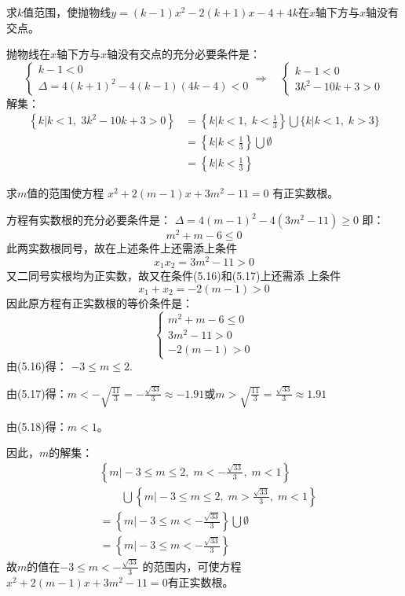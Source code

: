 \begin{example}
    求$k$值范围，使抛物线$y=(k-1)x^2-2(k+1)x-4+4k$在$x$轴下方与$x$轴没有交点。
\end{example}

\begin{solution}
    抛物线在$x$轴下方与$x$轴没有交点的充分必要条件是：
\[\begin{cases}
    k-1<0 \\ \Delta=4(k+1)^2-4(k-1)(4k-4)<0
\end{cases}\Rightarrow \quad \begin{cases}
    k-1<0 \\ 3k^2-10k+3>0
\end{cases}\]
解集：
\[\begin{split}
\left\{k|k<1,\; 3k^2-10k+3>0 \right\}&=\left\{k\Big|k<1,\; k<\frac{1}{3} \right\}\bigcup\{k|k<1,\; k>3 \}\\
&=\left\{k\Big|k<\frac{1}{3} \right\}\bigcup\emptyset\\
&=\left\{k\Big|k<\frac{1}{3} \right\}
\end{split}\]
\end{solution}

\begin{example}
    求$m$值的范围使方程
    $x^2+2(m-1)x+3m^2-11=0$
    有正实数根。
\end{example}

\begin{solution}
方程有实数根的充分必要条件是：
$\Delta=4(m-1)^2-4(3m^2-11)\ge 0$
即：
\begin{equation}
    m^2+m-6\le 0
\end{equation}
此两实数根同号，故在上述条件上还需添上条件
\begin{equation}
    x_1x_2=3m^2-11>0
\end{equation}
又二同号实根均为正实数，故又在条件(5.16)和(5.17)上还需添
上条件
\begin{equation}
    x_1+x_2=-2(m-1)>0
\end{equation}
因此原方程有正实数根的等价条件是：
\[\begin{cases}
    m^2+m-6\le 0\\
    3m^2-11>0\\
    -2(m-1)>0
\end{cases}\]
由(5.16)得：
$-3\le m\le 2$.

由(5.17)得：$m<-\sqrt{\frac{11}{3}}=-\frac{\sqrt{33}}{3}\approx -1.91$或$m>\sqrt{\frac{11}{3}}=\frac{\sqrt{33}}{3}\approx 1.91$

由(5.18)得：$m<1$。

因此，$m$的解集：
\[\begin{split}
   & \left\{m\Big|-3\le m\le 2,\; m<-\frac{\sqrt{33}}{3},\; m<1\right\}\\
   &\qquad \bigcup\left\{m\Big|-3\le m\le 2,\; m>\frac{\sqrt{33}}{3},\; m<1\right\}\\
    &=\left\{m\Big|-3\le m<-\frac{\sqrt{33}}{3}\right\}\bigcup \emptyset\\
    &=\left\{m\Big|-3\le m<-\frac{\sqrt{33}}{3}\right\}
\end{split}\]
故$m$的值在$-3\le m<-\frac{\sqrt{33}}{3}$
的范围内，可使方程$x^2+2(m-1)x+3m^2-11=0$有正实数根。
\end{solution}

